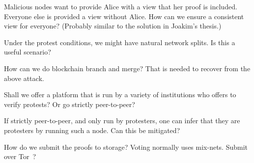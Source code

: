 \begin{frame}
  \begin{question}
    Malicious nodes want to provide Alice with a view that her proof is 
    included.
    Everyone else is provided a view without Alice.
    How can we ensure a consistent view for everyone?
    (Probably similar to the solution in Joakim's thesis.)
  \end{question}

  \begin{question}
    Under the protest conditions, we might have natural network splits.
    Is this a useful scenario?
  \end{question}

  \begin{question}
    How can we do blockchain branch and merge?
    That is needed to recover from the above attack.
  \end{question}
\end{frame}

\begin{frame}
  \begin{question}
    Shall we offer a platform that is run by a variety of institutions who 
    offers to verify protests?
    Or go strictly peer-to-peer?
  \end{question}
  \begin{question}
    If strictly peer-to-peer, and only run by protesters, one can infer that 
    they are protesters by running such a node.
    Can this be mitigated?
  \end{question}
\end{frame}

\begin{frame}
  \begin{question}
    How do we submit the proofs to storage?
    Voting normally uses mix-nets.
    Submit over Tor~\cite{Tor}?
  \end{question}

\end{frame}


